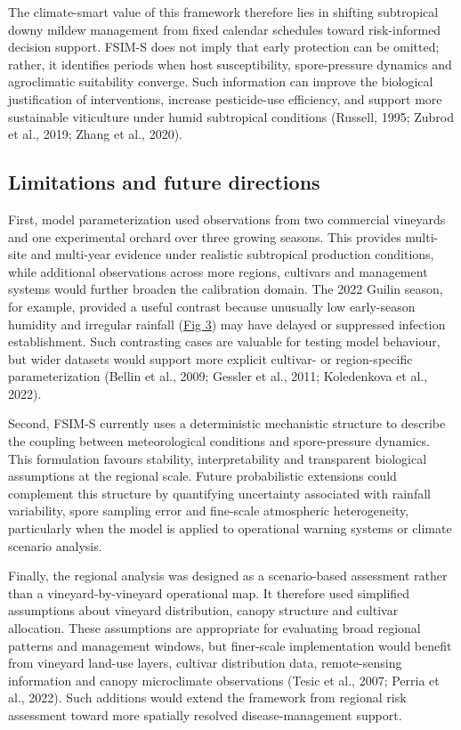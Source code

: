 \documentclass[
]{article}
\begin{document}
The climate-smart value of this framework therefore lies in shifting
subtropical downy mildew management from fixed calendar schedules toward
risk-informed decision support. FSIM-S does not imply that early
protection can be omitted; rather, it identifies periods when host
susceptibility, spore-pressure dynamics and agroclimatic suitability
converge. Such information can improve the biological justification of
interventions, increase pesticide-use efficiency, and support more
sustainable viticulture under humid subtropical conditions (Russell,
1995; Zubrod et al., 2019; Zhang et al., 2020).

\subsection{Limitations and future
directions}\label{limitations-and-future-directions}

First, model parameterization used observations from two commercial
vineyards and one experimental orchard over three growing seasons. This
provides multi-site and multi-year evidence under realistic subtropical
production conditions, while additional observations across more
regions, cultivars and management systems would further broaden the
calibration domain. The 2022 Guilin season, for example, provided a
useful contrast because unusually low early-season humidity and
irregular rainfall (\hyperref[_Ref214271335]{Fig 3}) may have delayed
or suppressed infection establishment. Such contrasting cases are
valuable for testing model behaviour, but wider datasets would support
more explicit cultivar- or region-specific parameterization (Bellin et
al., 2009; Gessler et al., 2011; Koledenkova et al., 2022).

Second, FSIM-S currently uses a deterministic mechanistic structure to
describe the coupling between meteorological conditions and
spore-pressure dynamics. This formulation favours stability,
interpretability and transparent biological assumptions at the regional
scale. Future probabilistic extensions could complement this structure
by quantifying uncertainty associated with rainfall variability, spore
sampling error and fine-scale atmospheric heterogeneity, particularly
when the model is applied to operational warning systems or climate
scenario analysis.

Finally, the regional analysis was designed as a scenario-based
assessment rather than a vineyard-by-vineyard operational map. It
therefore used simplified assumptions about vineyard distribution,
canopy structure and cultivar allocation. These assumptions are
appropriate for evaluating broad regional patterns and management
windows, but finer-scale implementation would benefit from vineyard
land-use layers, cultivar distribution data, remote-sensing information
and canopy microclimate observations (Tesic et al., 2007; Perria et
al., 2022). Such additions would extend the framework from regional risk
assessment toward more spatially resolved disease-management support.
\end{document}
